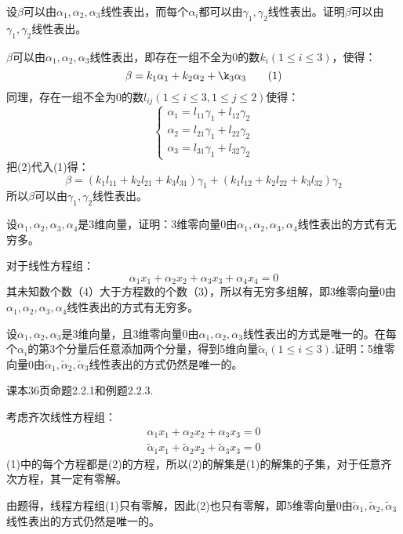 \documentclass[a4paper]{report}
\begin{document}
\EX 设$\beta$可以由$\alpha_1,\alpha_2,\alpha_3$线性表出，而每个$\alpha_i$都可以由$\gamma_1,\gamma_2$线性表出。证明$\beta$可以由$\gamma_1,\gamma_2$线性表出。

\begin{zhengming}
$\beta$可以由$\alpha_1,\alpha_2,\alpha_3$线性表出，即存在一组不全为0的数$k_i(1\leq i\leq3)$，使得：
\begin{equation*}
\beta = k_1\alpha_1+k_2\alpha_2+\k_3\alpha_3\tag{1}
\end{equation*}
同理，存在一组不全为0的数$l_{ij}(1\leq i\leq 3,1\leq j\leq 2)$使得：
\begin{equation*}
  \begin{cases}
    \alpha_1=l_{11}\gamma_{1}+l_{12}\gamma_{2}\\
    \alpha_2=l_{21}\gamma_{1}+l_{22}\gamma_{2}\\
    \alpha_3=l_{31}\gamma_{1}+l_{32}\gamma_{2}
  \end{cases}\tag{2}
\end{equation*}
把(2)代入(1)得：
\begin{equation*}
\beta=(k_1l_{11}+k_2l_{21}+k_3l_{31})\gamma_{1}+(k_1l_{12}+k_2l_{22}+k_3l_{32})\gamma_{2}
\end{equation*}
所以$\beta$可以由$\gamma_1,\gamma_2$线性表出。
\end{zhengming}

\EX 设$\alpha_1,\alpha_2,\alpha_3,\alpha_4$是3维向量，证明：3维零向量$0$由$\alpha_1,\alpha_2,\alpha_3,\alpha_4$线性表出的方式有无穷多。

\begin{zhengming}
对于线性方程组：
\begin{equation*}
\alpha_1x_1+\alpha_2x_2+\alpha_3x_3+\alpha_4x_4=0\tag{1}
\end{equation*}
其未知数个数（4）大于方程数的个数（3），所以有无穷多组解，即3维零向量$0$由$\alpha_1,\alpha_2,\alpha_3,\alpha_4$线性表出的方式有无穷多。
\end{zhengming}

\EX 设$\alpha_1,\alpha_2,\alpha_3$是3维向量，且3维零向量$0$由$\alpha_1,\alpha_2,\alpha_3$线性表出的方式是唯一的。在每个$\alpha_i$的第3个分量后任意添加两个分量，得到5维向量$\widetilde{\alpha}_{i}(1\leq i\leq 3)$.证明：5维零向量$0$由$\widetilde{\alpha}_{1},\widetilde{\alpha}_{2},\widetilde{\alpha}_{3}$线性表出的方式仍然是唯一的。

\begin{zhengming}
课本36页命题2.2.1和例题2.2.3.

考虑齐次线性方程组：
\begin{gather*}
\alpha_1x_1+\alpha_2x_2+\alpha_3x_3=0\tag{1}\\
\widetilde{\alpha} _{1}x_1+\widetilde{\alpha}_{2}x_2+\widetilde{\alpha}_{3}x_3=0\tag{2}
\end{gather*}
(1)中的每个方程都是(2)的方程，所以(2)的解集是(1)的解集的子集，对于任意齐次方程，其一定有零解。

由题得，线程方程组(1)只有零解，因此(2)也只有零解，即5维零向量$0$由$\widetilde{\alpha}_{1},\widetilde{\alpha}_{2},\widetilde{\alpha}_{3}$线性表出的方式仍然是唯一的。
\end{zhengming}
\end{document}
